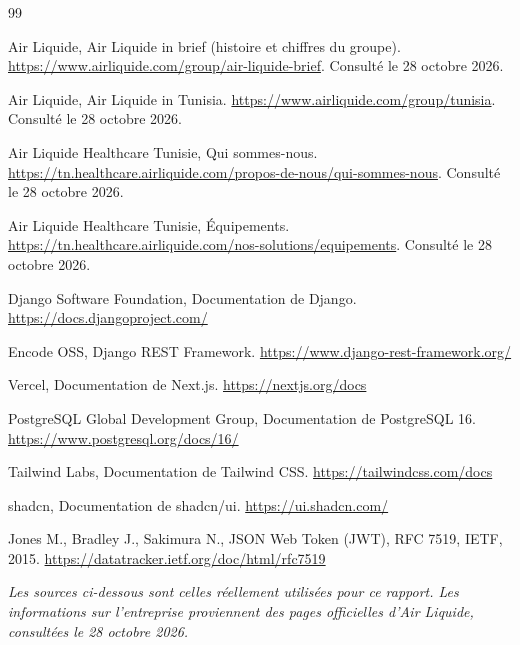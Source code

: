 {\small{}
\begin{thebibliography}{99}

Air Liquide, \og{}Air Liquide in brief\fg{} (histoire et chiffres du groupe). \url{https://www.airliquide.com/group/air-liquide-brief}. Consulté le 28 octobre 2026.

Air Liquide, \og{}Air Liquide in Tunisia\fg{}. \url{https://www.airliquide.com/group/tunisia}. Consulté le 28 octobre 2026.

Air Liquide Healthcare Tunisie, \og{}Qui sommes-nous\fg{}. \url{https://tn.healthcare.airliquide.com/propos-de-nous/qui-sommes-nous}. Consulté le 28 octobre 2026.

Air Liquide Healthcare Tunisie, \og{}Équipements\fg{}. \url{https://tn.healthcare.airliquide.com/nos-solutions/equipements}. Consulté le 28 octobre 2026.

Django Software Foundation, Documentation de Django. \url{https://docs.djangoproject.com/}

Encode OSS, Django REST Framework. \url{https://www.django-rest-framework.org/}

Vercel, Documentation de Next.js. \url{https://nextjs.org/docs}

PostgreSQL Global Development Group, Documentation de PostgreSQL 16. \url{https://www.postgresql.org/docs/16/}

Tailwind Labs, Documentation de Tailwind CSS. \url{https://tailwindcss.com/docs}

shadcn, Documentation de shadcn/ui. \url{https://ui.shadcn.com/}

Jones M., Bradley J., Sakimura N., \og{}JSON Web Token (JWT)\fg{}, RFC 7519, IETF, 2015. \url{https://datatracker.ietf.org/doc/html/rfc7519}
\end{thebibliography}
}

\vspace{0.6em}
\noindent\textit{Les sources ci-dessous sont celles réellement utilisées pour ce rapport. Les informations sur l'entreprise proviennent des pages officielles d'Air Liquide, consultées le 28 octobre 2026.}
